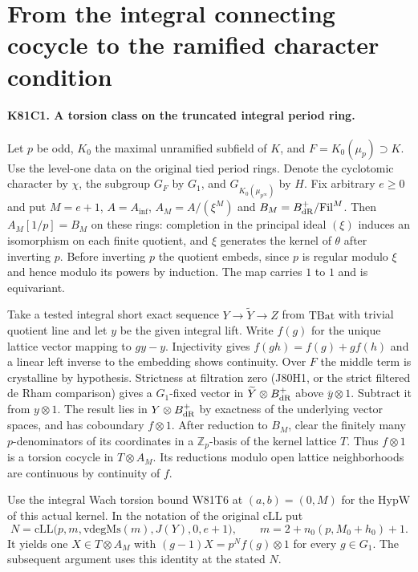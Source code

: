\section{From the integral connecting cocycle to the ramified character condition}

\paragraph{K81C1. A torsion class on the truncated integral period ring.}
Let $p$ be odd, $K_0$ the maximal unramified subfield of $K$, and
$F=K_0(\mu_p)\supset K$. Use the level-one data on the original tied
period rings. Denote the cyclotomic character by $\chi$, the subgroup
$G_F$ by $G_1$, and $G_{K_0(\mu_{p^\infty})}$ by $H$. Fix arbitrary
$e\ge0$ and put $M=e+1$, $A=A_{\inf}$, $A_M=A/(\xi^M)$ and
$B_M=B_{\rm dR}^+/\mathrm{Fil}^{M}$. Then $A_M[1/p]=B_M$ on
these rings: completion in the principal ideal $(\xi)$ induces an
isomorphism on each finite quotient, and $\xi$ generates the kernel
of $\theta$ after inverting $p$. Before inverting $p$ the quotient
embeds, since $p$ is regular modulo $\xi$ and hence modulo its
powers by induction. The map carries $1$ to $1$ and is equivariant.

Take a tested integral short exact sequence $Y\to\widetilde Y\to Z$
from $\mathrm{TBat}$ with trivial quotient line and let $y$ be the
given integral lift. Write $f(g)$ for the unique lattice vector
mapping to $gy-y$. Injectivity gives $f(gh)=f(g)+gf(h)$ and a
linear left inverse to the embedding shows continuity. Over $F$ the
middle term is crystalline by hypothesis. Strictness at filtration
zero (J80H1, or the strict filtered de Rham comparison) gives a
$G_1$-fixed vector in $\widetilde Y\otimes B_{\rm dR}^+$ above
$\bar y\otimes1$. Subtract it from $y\otimes1$. The result lies in
$Y\otimes B_{\rm dR}^+$ by exactness of the underlying vector
spaces, and has coboundary $f\otimes1$. After reduction to $B_M$,
clear the finitely many $p$-denominators of its coordinates in a
$\mathbb Z_p$-basis of the kernel lattice $T$. Thus $f\otimes1$ is
a torsion cocycle in $T\otimes A_M$. Its reductions modulo open
lattice neighborhoods are continuous by continuity of $f$.

Use the integral Wach torsion bound W81T6 at $(a,b)=(0,M)$ for the
$\mathrm{HypW}$ of this actual kernel. In the notation of the
original $\mathrm{cLL}$ put
\[
 N=\mathrm{cLL}\bigl(p,m,\mathrm{vdegMs}(m),J(Y),0,e+1\bigr),
 \qquad m=2+ n_0(p,M_0+h_0)+1.
\]
It yields one $X\in T\otimes A_M$ with
$(g-1)X=p^N f(g)\otimes1$ for every $g\in G_1$. The subsequent
argument uses this identity at the stated $N$.

